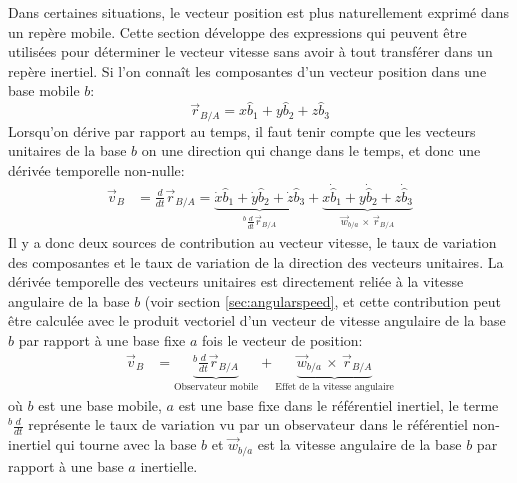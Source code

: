 
Dans certaines situations, le vecteur position est plus naturellement exprimé dans un repère mobile. Cette section développe des expressions qui peuvent être utilisées pour déterminer le vecteur vitesse sans avoir à tout transférer dans un repère inertiel. Si l'on connaît les composantes d'un vecteur position dans une base mobile $b$:
\begin{equation}
	\vec{r}_{B/A} = x \hat{b}_1 +  y \hat{b}_2 +  z \hat{b}_3
\end{equation}
Lorsqu'on dérive par rapport au temps, il faut tenir compte que les vecteurs unitaires de la base $b$ on une direction qui change dans le temps, et donc une dérivée temporelle non-nulle:
\begin{align}
	\vec{v}_{B} &= \frac{d}{dt} \vec{r}_{B/A} =
	\underbrace{
		\dot{x} \hat{b}_1 +  \dot{y} \hat{b}_2 +  \dot{z} \hat{b}_3
	}_{ {}^{b}\frac{d}{dt} \vec{r}_{B/A}  }
	+
	\underbrace{
		x \dot{\hat{b}}_1 +  y \dot{\hat{b}}_2 +  z \dot{\hat{b}}_3
	}_{  \vec{w}_{b/a} \, \times \, \vec{r}_{B/A}  }
	\label{eq:speedvec}
\end{align}
Il y a donc deux sources de contribution au vecteur vitesse, le taux de variation des composantes et le taux de variation de la direction des vecteurs unitaires. La dérivée temporelle des vecteurs unitaires est directement reliée à la vitesse angulaire de la base $b$ (voir section \ref{sec:angularspeed}, et cette contribution peut être calculée avec le produit vectoriel d'un vecteur de vitesse angulaire de la base $b$ par rapport à une base fixe $a$ fois le vecteur de position:
\begin{align}
	\vec{v}_{B} &=
	\underbrace{
		{}^{b}\frac{d}{dt} \vec{r}_{B/A}
	}_{\text{Observateur mobile}}
	+
	\underbrace{
		\vec{w}_{b/a} \, \times \, \vec{r}_{B/A}
	}_{\text{Effet de la vitesse angulaire}}
	\label{eq:speedprodvec}
\end{align}
où $b$ est une base mobile, $a$ est une base fixe dans le référentiel inertiel, le terme ${}^{b}\frac{d}{dt}$ représente le taux de variation vu par un observateur dans le référentiel non-inertiel qui tourne avec la base $b$ et $\vec{w}_{b/a}$ est la vitesse angulaire de la base $b$ par rapport à une base $a$ inertielle.


